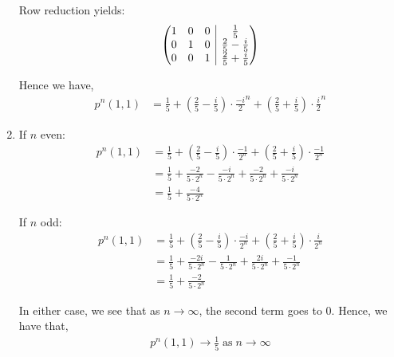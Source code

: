 \documentclass[12pt]{article}
\makeatletter
\newenvironment{amatrix}[1]{%
  \left(\begin{array}{@{}*{#1}{c}|c@{}}
}{%
  \end{array}\right)
}
\makeatother
\begin{document}
\begin{enumerate}[label=(\Alph*)]
Row reduction yields:
\begin{align*}
\begin{amatrix}{3}
1 & 0 & 0 & \frac{1}{5}\\
0 & 1 & 0 & \frac{2}{5} - \frac{i}{5}\\
0 & 0 & 1 & \frac{2}{5} + \frac{i}{5}
\end{amatrix}
\end{align*}

Hence we have,
\begin{align*}
p^n(1, 1) &= \frac{1}{5} + \left(\frac{2}{5} - \frac{i}{5}\right) \cdot \frac{-i}{2}^n + \left(\frac{2}{5} + \frac{i}{5}\right) \cdot \frac{i}{2}^n
\end{align*}

\item If $n$ even:
\begin{align*}
p^n(1, 1) &= \frac{1}{5} + \left(\frac{2}{5} - \frac{i}{5}\right) \cdot \frac{-1}{2^n} + \left(\frac{2}{5} + \frac{i}{5}\right) \cdot \frac{-1}{2^n}\\
&= \frac{1}{5} + \frac{-2}{5 \cdot 2^n} - \frac{-i}{5 \cdot 2^n} + \frac{-2}{5 \cdot 2^n} + \frac{-i}{5 \cdot 2^n}\\
&= \frac{1}{5} + \frac{-4}{5 \cdot 2^n}
\end{align*}

If $n$ odd:
\begin{align*}
p^n(1, 1) &= \frac{1}{5} + \left(\frac{2}{5} - \frac{i}{5}\right) \cdot \frac{-i}{2^n} + \left(\frac{2}{5} + \frac{i}{5}\right) \cdot \frac{i}{2^n}\\
&= \frac{1}{5} + \frac{-2i}{5 \cdot 2^n} - \frac{1}{5 \cdot 2^n} + \frac{2i}{5 \cdot 2^n} + \frac{-1}{5 \cdot 2^n}\\
&= \frac{1}{5} + \frac{-2}{5 \cdot 2^n}
\end{align*}

In either case, we see that as $n \to \infty$, the second term goes to $0$. Hence, we have that,
\begin{align*}
p^n(1, 1) \to \frac{1}{5} \; \text{as} \; n \to \infty
\end{align*}

\end{enumerate}
\end{document}
